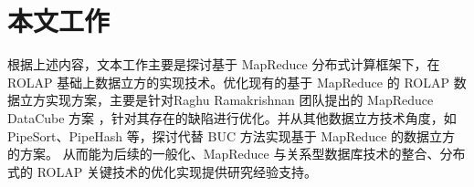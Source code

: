\section{本文工作}

根据上述内容，文本工作主要是探讨基于 MapReduce 分布式计算框架下，在 ROLAP 基础上数据立方的实现技术。优化现有的基于 MapReduce 的 ROLAP 数据立方实现方案，主要是针对Raghu Ramakrishnan 团队提出的 MapReduce DataCube 方案 \cite{nandi2012data} \cite{nandi2011distributed}，针对其存在的缺陷进行优化。并从其他数据立方技术角度，如 PipeSort、PipeHash 等，探讨代替 BUC 方法实现基于 MapReduce 的数据立方的方案。 从而能为后续的一般化、MapReduce 与关系型数据库技术的整合、分布式的 ROLAP 关键技术的优化实现提供研究经验支持。



